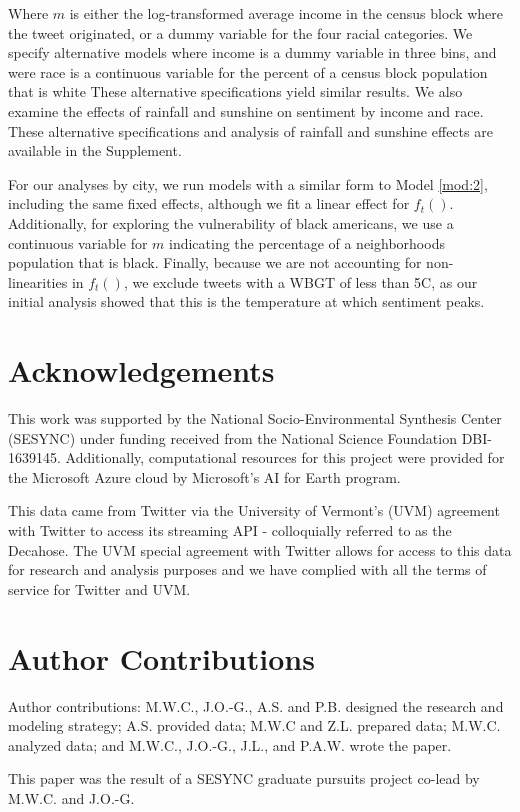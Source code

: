 \documentclass[fleqn,10pt]{wlscirep}
\begin{document}
Where $m$ is either the log-transformed average income in the census block where the tweet originated, or a dummy variable for the four racial categories.  We specify alternative models where income is a dummy variable in three bins, and were race is a continuous variable for the percent of a census block population that is white These alternative specifications yield similar results.  We also examine the effects of rainfall and sunshine on sentiment by income and race.  These alternative specifications and analysis of rainfall and sunshine effects are available in the Supplement.

For our analyses by city, we run models with a similar form to Model \ref{mod:2}, including the same fixed effects, although we fit a linear effect for $f_t()$.  Additionally, for exploring the vulnerability of black americans, we use a continuous variable for $m$ indicating the percentage of a neighborhoods population that is black.  Finally, because we are not accounting for non-linearities in $f_t()$, we exclude tweets with a WBGT of less than 5\textdegree C, as our initial analysis showed that this is the temperature at which sentiment peaks.

\section*{Acknowledgements}
This work was supported by the National Socio-Environmental Synthesis Center (SESYNC) under funding received from the National Science Foundation DBI-1639145.  Additionally, computational resources for this project were provided for the Microsoft Azure cloud by Microsoft's AI for Earth program.

This data came from Twitter via the University of Vermont’s (UVM) agreement with Twitter to access its streaming API - colloquially referred to as the Decahose.  The UVM special agreement with Twitter allows for access to this data for research and analysis purposes and we have complied with all the terms of service for Twitter and UVM. 



\section*{Author Contributions}
Author contributions: M.W.C., J.O.-G., A.S. and P.B. designed the research and modeling strategy; A.S. provided data; M.W.C and Z.L. prepared data; M.W.C. analyzed data; and M.W.C., J.O.-G., J.L., and P.A.W. wrote the paper.

\noindent This paper was the result of a SESYNC graduate pursuits project co-lead by M.W.C. and J.O.-G.
\end{document}
